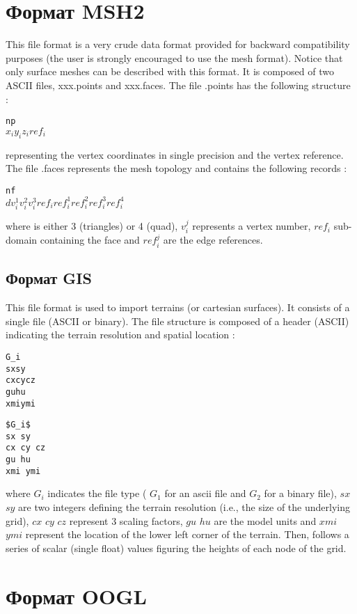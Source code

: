 \documentclass[a4paper,12pt]{article}
\begin{document}
\section{Формат MSH2}

This file format is a very crude data format provided for backward compatibility purposes (the user is
strongly encouraged to use the mesh format). Notice that only surface meshes can be described with
this format. It is composed of two ASCII files, xxx.points and xxx.faces. The file .points
has the following structure :
\begin{alltt}
np
$x_i y_i z_i ref_i$
\end{alltt}
representing the vertex coordinates in single precision and the vertex reference. The file .faces
represents the mesh topology and contains the following records :
\begin{alltt}
nf
$d v_i^1 v_i^2 v_i^3 ref_i ref_i^1 ref_i^2 ref_i^3 ref_i^4$
\end{alltt}
where is either 3 (triangles) or 4 (quad), $v_i^j$ represents a vertex number, $ref_i$ sub-domain containing the face and $ref_i^j$ are the edge references.


\subsection{Формат GIS}

This file format is used to import terrains (or cartesian surfaces). It consists of a single file (ASCII
or binary). The file structure is composed of a header (ASCII) indicating the terrain resolution and
spatial location :
\begin{alltt}
G_i
sx sy
cx cy cz
gu hu
xmi ymi
\end{alltt}
\begin{lstlisting}[mathescape]
$G_i$
sx sy
cx cy cz
gu hu
xmi ymi
\end{lstlisting}

where $G_i$ indicates the file type ( $G_1$ for an ascii file and $G_2$ for a binary file), $sx$ $sy$ are two integers
defining the terrain resolution (i.e., the size of the underlying grid), $cx$ $cy$ $cz$ represent 3 scaling
factors, $gu$ $hu$ are the model units and $xmi$ $ymi$ represent the location of the lower left corner of the
terrain. Then, follows a series of scalar (single float) values figuring the heights of each node of the
grid.

\clearpage



\section{Формат OOGL}
\end{document}
